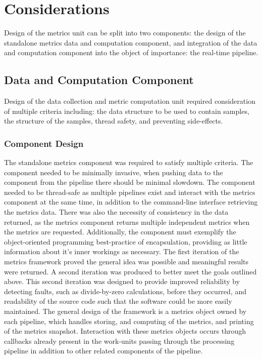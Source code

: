 \section{Considerations}

Design of the metrics unit can be split into two components: the design of the
standalone metrics data and computation component, and integration of the data
and computation component into the object of importance: the \gls{real-time}
\gls{pipeline}.

\subsection{Data and Computation Component}

Design of the data collection and metric computation unit required consideration
of multiple criteria including: the data structure to be used to contain
samples, the structure of the samples, thread safety, and preventing
side-effects.

\subsubsection{Component Design}

The standalone metrics component was required to satisfy multiple criteria. The
component needed to be minimally invasive, when pushing data to the component
from the pipeline there should be minimal slowdown. The component needed to be
thread-safe as multiple pipelines exist and interact with the metrics component
at the same time, in addition to the command-line interface retrieving the metrics
data. There was also the necessity of consistency in the data returned, as
the metrics component returns multiple independent metrics when the metrics are
requested. Additionally, the component must exemplify the object-oriented
programming best-practice of encapsulation, providing as little information
about it's inner workings as necessary. The first iteration of the metrics
framework proved the general idea was possible and meaningful results were
returned. A second iteration was produced to better meet the goals outlined
above. This second iteration was designed to provide improved reliability by
detecting faults, such as divide-by-zero calculations, before they occurred, and
readability of the source code such that the software could be more easily
maintained. The general design of the framework is a metrics object owned by
each \gls{pipeline}, which handles storing, and computing of the metrics, and
printing of the metrics snapshot. Interaction with these metrics objects occurs
through callbacks already present in the \glspl{work-unit} passing through the
processing \gls{pipeline} in addition to other related components of the
pipeline.

